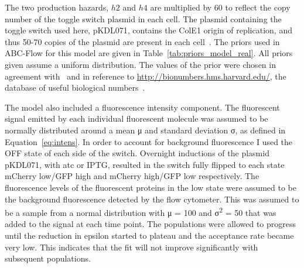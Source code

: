 The two production hazards, $h2$ and $h4$ are multiplied by 60 to reflect the copy number of the toggle switch plasmid in each cell. The plasmid containing the toggle switch used here, pKDL071, contains the ColE1 origin of replication, and thus 50-70 copies of the plasmid are present in each cell~\autocite{Milo:2010cz}. The priors used in ABC-Flow for this model are given in Table~\ref{tab:priors_model_real}. All priors given assume a uniform distribution. The values of the prior were chosen in agreement with~\autocite{Lillacci:2013hu} and in reference to \url{http://bionumbers.hms.harvard.edu/}, the database of useful biological numbers~\autocite{Milo:2010cz}. 

The model also included a fluorescence intensity component. The fluorescent signal emitted by each individual fluorescent molecule was assumed to be normally distributed around a mean μ and standard deviation σ, as defined in Equation~\ref{eq:intens}. In order to account for background fluorescence I used the OFF state of each side of the switch. Overnight inductions of the plasmid pKDL071, with \acrshort{atc} or IPTG, resulted in the switch fully flipped to each state mCherry low/GFP high and mCherry high/GFP low respectively. The fluorescence levels of the fluorescent proteins in the low state were assumed to be the background fluorescence detected by the flow cytometer. This was assumed to be a sample from a normal distribution with μ = 100 and σ\textsuperscript{2} = 50 that was added to the signal at each time point. The populations were allowed to progress until the reduction in epsilon started to plateau and the acceptance rate became very low. This indicates that the fit will not improve significantly with subsequent populations.





